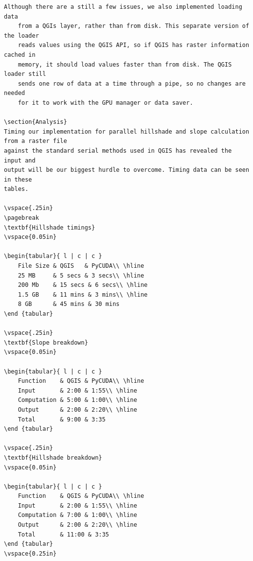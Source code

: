 \documentclass[journal]{IEEEtran}
\begin{document}
\begin{Verbatim}[frame=single]
    Although there are a still a few issues, we also implemented loading data
    from a QGIs layer, rather than from disk. This separate version of the loader
    reads values using the QGIS API, so if QGIS has raster information cached in
    memory, it should load values faster than from disk. The QGIS loader still
    sends one row of data at a time through a pipe, so no changes are needed
    for it to work with the GPU manager or data saver.
    
\section{Analysis}
Timing our implementation for parallel hillshade and slope calculation from a raster file
against the standard serial methods used in QGIS has revealed the input and
output will be our biggest hurdle to overcome. Timing data can be seen in these
tables.

\vspace{.25in}
\pagebreak
\textbf{Hillshade timings}
\vspace{0.05in}

\begin{tabular}{ l | c | c }
    File Size & QGIS   & PyCUDA\\ \hline
    25 MB     & 5 secs & 3 secs\\ \hline
    200 Mb    & 15 secs & 6 secs\\ \hline
    1.5 GB    & 11 mins & 3 mins\\ \hline
    8 GB      & 45 mins & 30 mins
\end {tabular}

\vspace{.25in}
\textbf{Slope breakdown}
\vspace{0.05in}

\begin{tabular}{ l | c | c }
    Function    & QGIS & PyCUDA\\ \hline
    Input       & 2:00 & 1:55\\ \hline
    Computation & 5:00 & 1:00\\ \hline
    Output      & 2:00 & 2:20\\ \hline
    Total       & 9:00 & 3:35
\end {tabular}

\vspace{.25in}
\textbf{Hillshade breakdown}
\vspace{0.05in}

\begin{tabular}{ l | c | c }
    Function    & QGIS & PyCUDA\\ \hline
    Input       & 2:00 & 1:55\\ \hline
    Computation & 7:00 & 1:00\\ \hline
    Output      & 2:00 & 2:20\\ \hline
    Total       & 11:00 & 3:35
\end {tabular}
\vspace{0.25in}


\end{Verbatim}
\end{document}
